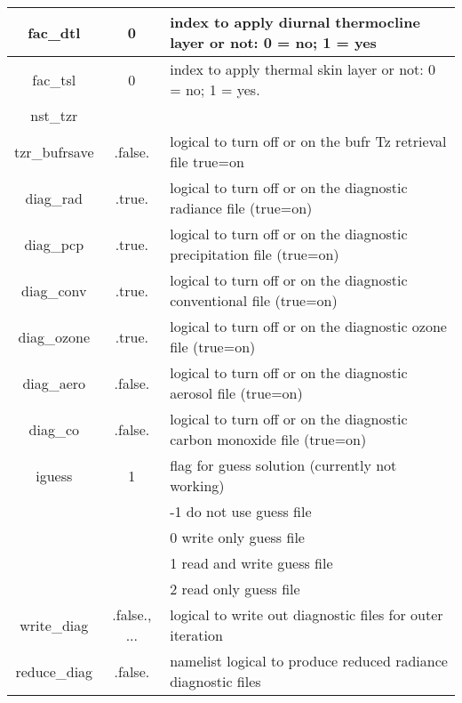 \begin{table}[h]
\begin{tabular}{| c | c | p{9cm} |}
  \hline
  fac\_dtl & 0 & index to apply diurnal thermocline layer  or not: 0 = no; 1 = yes \\
  \hline
  fac\_tsl & 0 & index to apply thermal skin layer or not: 0 = no; 1 = yes. \\
  \hline
  nst\_tzr & & \\
  \hline
  tzr\_bufrsave	& .false. & logical to turn off or on the bufr Tz retrieval file true=on \\
  \hline
  diag\_rad & .true. & logical to turn off or on the diagnostic radiance file (true=on) \\
  \hline
  diag\_pcp & .true. & logical to turn off or on the diagnostic precipitation file (true=on) \\
  \hline
  diag\_conv & .true. & logical to turn off or on the diagnostic conventional file (true=on) \\
  \hline
  diag\_ozone &	.true. & logical to turn off or on the diagnostic ozone file (true=on) \\
  \hline
  diag\_aero & .false. & logical to turn off or on the diagnostic aerosol file (true=on) \\
  \hline
  diag\_co & .false. & logical to turn off or on the diagnostic carbon monoxide file (true=on) \\
  \hline
  iguess & 1 & flag for guess solution (currently not working) \\
           & & -1    do not use guess file \\
           & &  0    write only guess file \\
           & &  1    read and write guess file \\
           & &  2    read only guess file \\
  \hline
  write\_diag & .false., ... & logical to write out diagnostic files for outer iteration \\
  \hline
  reduce\_diag & .false. & namelist logical to produce reduced radiance diagnostic files \\
  \hline
  \end{tabular}
\end{table}
  
